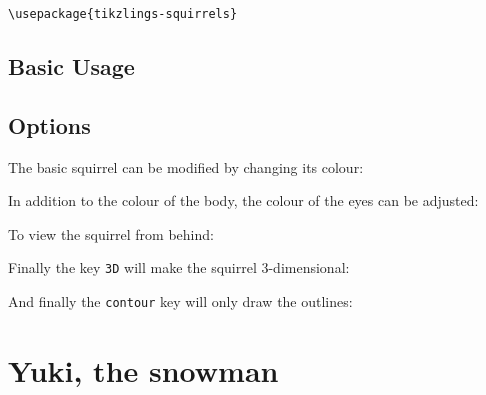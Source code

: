 \documentclass[parskip=half]{scrartcl}
\begin{document}
\begin{tcolorbox}[lower separated=false, lefthand width=.8\linewidth]
\vspace*{0.5cm}
\lstinline|\usepackage{tikzlings-squirrels}| 
\vspace*{0.5cm}
\end{tcolorbox}

\subsection{Basic Usage}

\begin{tcblisting}{}
\squirrel
\end{tcblisting}

\subsection{Options}

The basic squirrel can be modified by changing its colour:
\begin{tcblisting}{}
\squirrel[body=blue]
\end{tcblisting}

In addition to the colour of the body, the colour of the eyes can be adjusted:
\begin{tcblisting}{}
\squirrel[eye=red]
\end{tcblisting}
\begin{tcblisting}{}
\squirrel[pupil=red]
\end{tcblisting}

To view the squirrel from behind:
\begin{tcblisting}{}
\squirrel[back]
\end{tcblisting}

Finally the key \lstinline|3D| will make the squirrel 3-dimensional:
\begin{tcblisting}{}
\squirrel[3D]
\end{tcblisting}

And finally the \lstinline|contour| key will only draw the outlines:
\begin{tcblisting}{}
\squirrel[contour=black]
\end{tcblisting}

%
%
\clearpage
\section[Snowman]{Yuki, the snowman}
\end{document}
